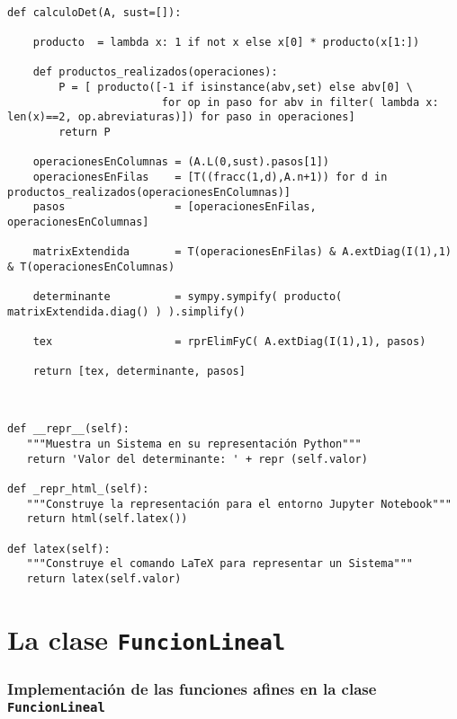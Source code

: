 \documentclass[11pt]{report}
\begin{document}
\begin{verbatim}

def calculoDet(A, sust=[]):
    
    producto  = lambda x: 1 if not x else x[0] * producto(x[1:])
    
    def productos_realizados(operaciones):
        P = [ producto([-1 if isinstance(abv,set) else abv[0] \
                        for op in paso for abv in filter( lambda x: len(x)==2, op.abreviaturas)]) for paso in operaciones]
        return P
    
    operacionesEnColumnas = (A.L(0,sust).pasos[1])
    operacionesEnFilas    = [T((fracc(1,d),A.n+1)) for d in productos_realizados(operacionesEnColumnas)]
    pasos                 = [operacionesEnFilas, operacionesEnColumnas]
    
    matrixExtendida       = T(operacionesEnFilas) & A.extDiag(I(1),1) & T(operacionesEnColumnas)
    
    determinante          = sympy.sympify( producto( matrixExtendida.diag() ) ).simplify()
    
    tex                   = rprElimFyC( A.extDiag(I(1),1), pasos)
    
    return [tex, determinante, pasos]
    
\end{verbatim}

\begin{verbatim}

def __repr__(self):
   """Muestra un Sistema en su representación Python"""
   return 'Valor del determinante: ' + repr (self.valor)

def _repr_html_(self):
   """Construye la representación para el entorno Jupyter Notebook"""
   return html(self.latex())

def latex(self):
   """Construye el comando LaTeX para representar un Sistema"""
   return latex(self.valor)

\end{verbatim}


\part{La clase \texttt{FuncionLineal}}
\label{sec:org3a3fa1c}

\section{Implementación de las funciones afines en la clase \texttt{FuncionLineal}}
\label{sec:org97ca2b9}
\end{document}
